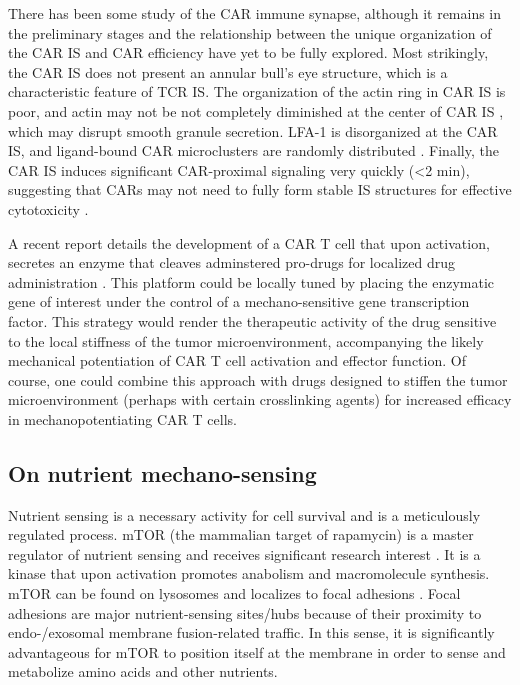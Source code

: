 There has been some study of the CAR immune synapse, although it remains in the preliminary stages and the relationship between the unique organization of the CAR IS and CAR efficiency have yet to be fully explored. Most strikingly, the CAR IS does not present an annular bull's eye structure, which is a characteristic feature of TCR IS.  The organization of the actin ring in CAR IS is poor, and actin may not be not completely diminished at the center of CAR IS \cite{Xiong2018}, which may disrupt smooth granule secretion. LFA-1 is disorganized at the CAR IS, and ligand-bound CAR microclusters are randomly distributed \cite{Davenport2019}. Finally, the CAR IS induces significant CAR-proximal signaling very quickly (\textless 2 min), suggesting that CARs may not need to fully form stable IS structures for effective cytotoxicity \cite{Li2020, Watanabe2018}. 

A recent report details the development of a CAR T cell that upon activation, secretes an enzyme that cleaves adminstered pro-drugs for localized drug administration \cite{Gardner2021}. This platform could be locally tuned by placing the enzymatic gene of interest under the control of a mechano-sensitive gene transcription factor. This strategy would render the therapeutic activity of the drug sensitive to the local stiffness of the tumor microenvironment, accompanying the likely mechanical potentiation of CAR T cell activation and effector function. Of course, one could combine this approach with drugs designed to stiffen the tumor microenvironment (perhaps with certain crosslinking agents) for increased efficacy in mechanopotentiating CAR T cells. 

\subsection{On nutrient mechano-sensing}

Nutrient sensing is a necessary activity for cell survival and is a meticulously regulated process. mTOR (the mammalian target of rapamycin) is a master regulator of nutrient sensing and receives significant research interest \cite{Park2020}. It is a kinase that upon activation promotes anabolism and macromolecule synthesis. mTOR can be found on lysosomes \cite{Rabanal-Ruiz2018} and localizes to focal adhesions \cite{Rabanal-Ruiz2018}. Focal adhesions are major nutrient-sensing sites/hubs \cite{Hamidi2021} because of their proximity to  endo-/exosomal membrane fusion-related traffic. In this sense, it is significantly advantageous for mTOR to position itself at the membrane in order to sense and metabolize amino acids \cite{Shimobayashi2016} and other nutrients.

